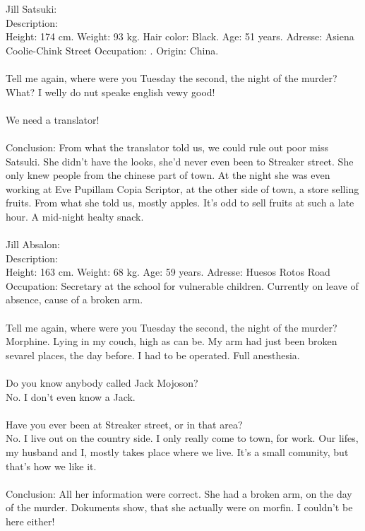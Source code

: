 \documentclass[]{article}
\begin{document}
Jill Satsuki: \\
Description: \\ Height: 174 cm. Weight: 93 kg. Hair color: Black. Age: 51 years. Adresse: Asiena Coolie-Chink Street  Occupation: . Origin: China.
\\ \\
Tell me again, where were you Tuesday the second, the night of the murder? \\
What? I welly do nut speake english vewy good! \\ \\
We need a translator! \\ \\
Conclusion: From what the translator told us, we could rule out poor miss Satsuki. She didn't have the looks, she'd never even been to Streaker street. She only knew people from the chinese part of town. At the night she was even working at Eve Pupillam Copia Scriptor, at the other side of town, a store selling fruits. From what she told us, mostly apples. It's odd to sell fruits at such a late hour. A mid-night healty snack.
\\ \\

Jill Absalon: \\
Description: \\ Height: 163 cm. Weight: 68 kg. Age: 59 years. Adresse: Huesos Rotos Road Occupation: Secretary at the school for vulnerable children. Currently on leave of absence, cause of a broken arm.
\\ \\
Tell me again, where were you Tuesday the second, the night of the murder? \\
Morphine. Lying in my couch, high as can be. My arm had just been broken sevarel places, the day before. I had to be operated. Full anesthesia.
\\ \\
Do you know anybody called Jack Mojoson? \\
No. I don't even know a Jack. 
\\ \\
Have you ever been at Streaker street, or in that area? \\ 
No. I live out on the country side. I only really come to town, for work. Our lifes, my husband and I, mostly takes place where we live. It's a small comunity, but that's how we like it.
\\ \\
Conclusion: All her information were correct. She had a broken arm, on the day of the murder. Dokuments show, that she actually were on morfin. I couldn't be here either!
\end{document}
